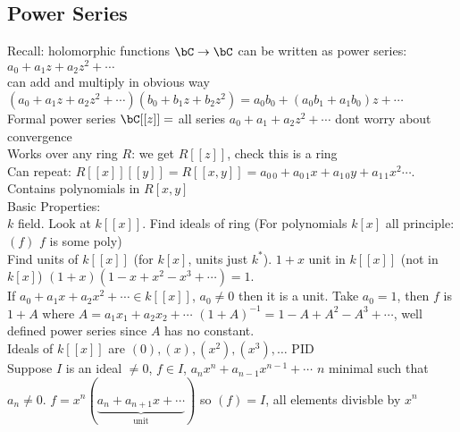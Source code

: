 
\subsection{Power Series} 

Recall: holomorphic functions $\bC \to \bC$ can be written as power series: $a_0 + a_1z + a_2z^2 + \cdots$ \\
can add and multiply in obvious way $(a_0 + a_1z + a_2z^2 + \cdots)(b_0 + b_1z + b_2z^2) = a_0b_0 + (a_0b_1 + a_1b_0)z + \cdots$ \\
Formal power series $\bC [[z]] = $ all series $a_0 + a_1 + a_2z^2 + \cdots$ dont worry about convergence \\ 
Works over any ring $R$: we get $R[[z]]$, check this is a ring\\
Can repeat: $R[[x]][[y]] = R[[x,y]] = a_{0 \, 0} + a_{0 \, 1}x + a_{1 \, 0}y + a_{1 \, 1}x^2 \cdots$. Contains polynomials in $R[x,y]$ \\

\noindent
Basic Properties:  \\ 
$k$ field. Look at $k[[x]]$. Find ideals of ring (For polynomials $k[x]$ all principle: $(f)$ $f$ is some poly) \\ 
Find units of $k[[x]]$ (for $k[x]$, units just $k^*$). $1 + x$ unit in $k[[x]]$ (not in $k[x]$) $(1 + x)(1-x+x^2 -x^3 + \cdots) = 1$. \\
If $a_0 + a_1x + a_2x^2 + \cdots \in k[[x]]$, $a_0 \neq 0$ then it is a unit. Take $a_0 = 1$, then $f$ is $1 + A$ where $A = a_1x_1 + a_2x_2 + \cdots$ $(1 + A)^{-1} = 1 - A + A^2 - A^3 + \cdots$, well defined power series since $A$ has no constant. \\

\noindent
Ideals of $k[[x]]$ are $(0), (x), (x^2), (x^3), \ldots$ PID \\
Suppose $I$ is an ideal $\neq 0$, $f \in I$, $a_nx^n + a_{n-1}x^{n-1} + \cdots$ $n$ minimal such that $a_n \neq 0$. $f = x^n(\underbrace{a_n + a_{n+1}x + \cdots}_{\text{unit}})$ so $(f) = I$, all elements divisble by $x^n$ \\

